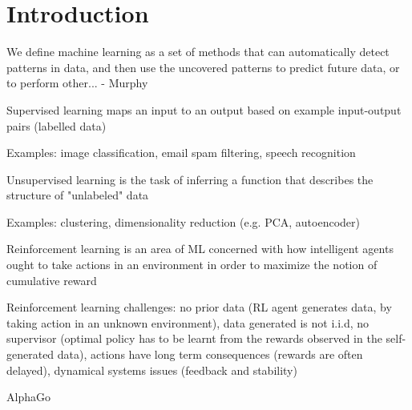 \chapter{Introduction}


We define machine learning as a set of methods that can automatically detect patterns
in data, and then use the uncovered patterns to predict future data, or to perform other... - Murphy

Supervised learning maps an input to an output based on example input-output pairs (labelled data)

Examples: image classification, email spam filtering, speech recognition

Unsupervised learning is the task of inferring a function that describes the structure
of "unlabeled" data

Examples: clustering, dimensionality reduction (e.g. PCA, autoencoder)

Reinforcement learning is an area of ML concerned with how intelligent agents ought
to take actions in an environment in order to maximize the notion of cumulative reward

Reinforcement learning challenges: no prior data (RL agent generates data, by taking action in an unknown environment),
data generated is not i.i.d, no supervisor (optimal policy has to be learnt from the rewards observed in the self-generated data),
actions have long term consequences (rewards are often delayed), dynamical systems issues (feedback and stability)

AlphaGo